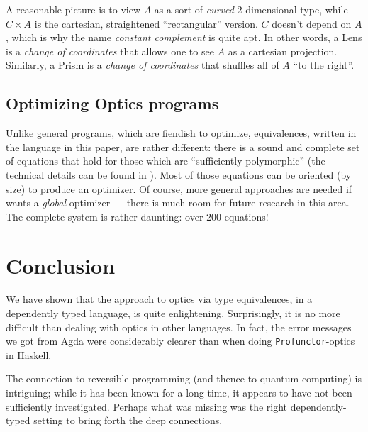 \documentclass[sigplan,review,anonymous]{acmart}
\begin{document}
A reasonable picture is to view $A$ as a sort of \emph{curved}
2-dimensional type, while
$C × A$ is the cartesian, straightened ``rectangular'' version. $C$ doesn't depend on $A$, which is
why the name \emph{constant complement} is quite apt.  In other words, a Lens is a
\emph{change of coordinates}
that allows one to see $A$ as a cartesian projection. Similarly, a Prism is a
\emph{change of coordinates} that shuffles all of $A$ ``to the right''.

\subsection{Optimizing Optics programs}

Unlike general programs, which are fiendish to optimize, equivalences, written
in the language in this paper, are rather different: there is a sound and
complete set of equations that hold for those which are
``sufficiently polymorphic'' (the technical details can be found in
\cite{laplaza72,Fiore-2008}).  Most of those equations can be oriented
(by size) to produce an optimizer.  Of course, more general approaches are
needed if wants a \emph{global} optimizer --- there is much room for future
research in this area.  The complete system is rather daunting: over $200$
equations!

\section{Conclusion}

We have shown that the approach to optics via type equivalences, in a
dependently typed language, is quite enlightening. Surprisingly, it is
no more difficult than dealing with optics in other languages. In fact,
the error messages we got from Agda were considerably clearer than when
doing \texttt{Profunctor}-optics in Haskell.

The connection to reversible programming (and thence to quantum computing)
is intriguing; while it has been known for a long time, it appears to have
not been sufficiently investigated.  Perhaps what was missing was the right
dependently-typed setting to bring forth the deep connections.



\end{document}
